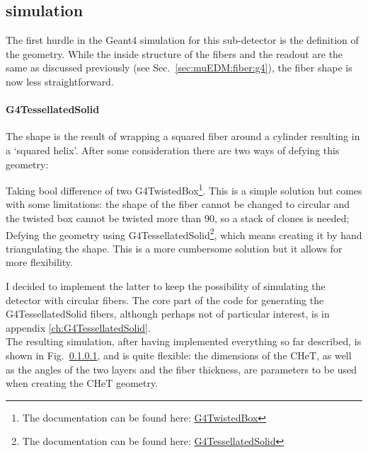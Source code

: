 \begin{refsection}
    \subsection{\gf simulation}
        The first hurdle in the Geant4 simulation for this sub-detector is the definition of the geometry.
        While the inside structure of the fibers and the readout are the same as discussed previously (see Sec.~\ref{sec:muEDM:fiber:g4}), the fiber shape is now less straightforward.
        
        \paragraph{G4TessellatedSolid}
        The shape is the result of wrapping a squared fiber around a cylinder resulting in a `squared helix'.
        After some consideration there are two ways of defying this geometry:
        \begin{outline}
            \1 Taking bool difference of two G4TwistedBox\footnote{The documentation can be found here: \href{https://apc.u-paris.fr/~franco/g4doxy/html/classG4TwistedBox.html}{G4TwistedBox}}. 
            This is a simple solution but comes with some limitations: the shape of the fiber cannot be changed to circular and the twisted box cannot be twisted more than \SI{90}{\deg}, so a stack of clones is needed; 
            \1 Defying the geometry using G4TessellatedSolid\footnote{The documentation can be found here: \href{https://apc.u-paris.fr/~franco/g4doxy/html/classG4TessellatedSolid.html}{G4TessellatedSolid}}, which means creating it by hand triangulating the shape. This is a more cumbersome solution but it allows for more flexibility.
        \end{outline}
        I decided to implement the latter to keep the possibility of simulating the detector with circular fibers.
        The core part of the code for generating the G4TessellatedSolid fibers, although perhaps not of particular interest, is in appendix \ref{ch:G4TessellatedSolid}.\\

        \noindent
        The resulting simulation, after having implemented everything so far described, is shown in Fig.~\ref{}, and is quite flexible: the dimensions of the CHeT, as well as the angles of the two layers and the fiber thickness, are parameters to be used when creating the CHeT geometry.
        

\end{refsection}
